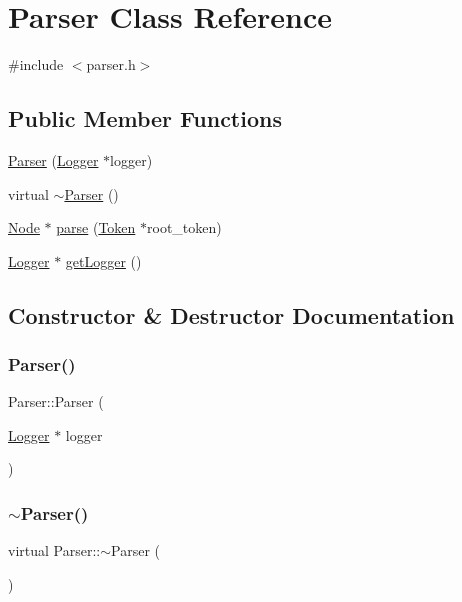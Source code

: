 \hypertarget{classParser}{}\section{Parser Class Reference}
\label{classParser}


{\ttfamily \#include $<$parser.\+h$>$}

\subsection*{Public Member Functions}
\begin{DoxyCompactItemize}
\item 
\hyperlink{classParser_a803d4bd64cf277f60b98e52d3dbc7220}{Parser} (\hyperlink{classLogger}{Logger} $\ast$logger)
\item 
virtual \hyperlink{classParser_ad576b92b9cc324f6f41b0269a9a1a546}{$\sim$\+Parser} ()
\item 
\hyperlink{classNode}{Node} $\ast$ \hyperlink{classParser_ab6d7f459c011482f94ee185fc4779168}{parse} (\hyperlink{classToken}{Token} $\ast$root\+\_\+token)
\item 
\hyperlink{classLogger}{Logger} $\ast$ \hyperlink{classParser_a87f0d3ea4178cfba8aaf9f898ce899e6}{get\+Logger} ()
\end{DoxyCompactItemize}


\subsection{Constructor \& Destructor Documentation}
\mbox{\label{classParser_a803d4bd64cf277f60b98e52d3dbc7220}} 
\subsubsection{\texorpdfstring{Parser()}{Parser()}}
{\footnotesize\ttfamily Parser\+::\+Parser (\begin{DoxyParamCaption}\item[{\hyperlink{classLogger}{Logger} $\ast$}]{logger }\end{DoxyParamCaption})}

\mbox{\label{classParser_ad576b92b9cc324f6f41b0269a9a1a546}} 
\subsubsection{\texorpdfstring{$\sim$\+Parser()}{~Parser()}}
{\footnotesize\ttfamily virtual Parser\+::$\sim$\+Parser (\begin{DoxyParamCaption}{ }\end{DoxyParamCaption})\hspace{0.3cm}{\ttfamily [virtual]}}



